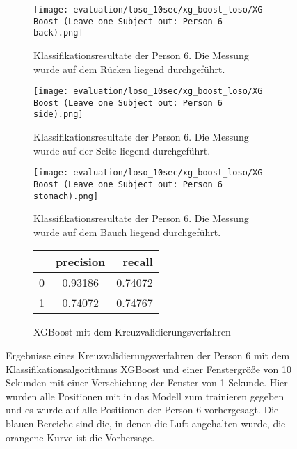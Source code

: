 \begin{figure}[ht]
    \centering
    \begin{subfigure}{1\textwidth}
        \texttt{[image: evaluation/loso\_10sec/xg\_boost\_loso/XG Boost (Leave one Subject out: Person 6 back).png]}
        \caption{Klassifikationsresultate der Person 6. Die Messung wurde auf dem Rücken liegend durchgeführt.}
      \end{subfigure}
      \begin{subfigure}{1\textwidth}
        \texttt{[image: evaluation/loso\_10sec/xg\_boost\_loso/XG Boost (Leave one Subject out: Person 6 side).png]}
        \caption{Klassifikationsresultate der Person 6. Die Messung wurde auf der Seite liegend durchgeführt.}
      \end{subfigure}
      \begin{subfigure}{1\textwidth}
        \texttt{[image: evaluation/loso\_10sec/xg\_boost\_loso/XG Boost (Leave one Subject out: Person 6 stomach).png]}
        \caption{Klassifikationsresultate der Person 6. Die Messung wurde auf dem Bauch liegend durchgeführt.}
    \end{subfigure}
    \label{evaluation:xgboost_loso_10:person6}

    \begin{subfigure}{1\textwidth}
        \begin{center}
            \begin{tabular}{ | l | c | r | }
              \hline
               & precision & recall \\ \hline
              0 & 0.93186 & 0.74072 \\ \hline
              1 & 0.74072 & 0.74767 \\
              \hline
            \end{tabular}
        \end{center}
        \caption{XGBoost mit dem Kreuzvalidierungsverfahren}
        \label{implementation:app:screenshots:user_studies_information}
    \end{subfigure}
    \caption{Ergebnisse eines Kreuzvalidierungsverfahren der Person 6 mit dem Klassifikationsalgorithmus XGBoost und einer Fenstergröße von 10 Sekunden mit einer Verschiebung der Fenster von 1 Sekunde. Hier wurden alle Positionen mit in das Modell zum trainieren gegeben und es wurde auf alle Positionen der Person 6 vorhergesagt. Die blauen Bereiche sind die, in denen die Luft angehalten wurde, die orangene Kurve ist die Vorhersage.}
\end{figure}

